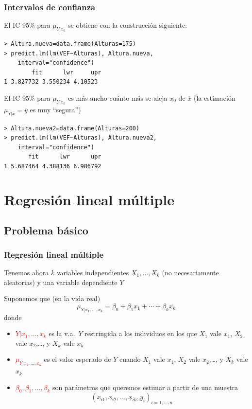 \documentclass[12pt,t]{beamer}
\newcommand{\red}[1]{\textcolor{red}{#1}}
\theoremstyle{plain}
\theoremstyle{definition}
\begin{document}
\begin{frame}[fragile]
\frametitle{Intervalos de confianza}
El IC 95\% para $\mu_{Y|x_0}$ se obtiene con la construcción siguiente:\medskip

\begin{lstlisting}
> Altura.nueva=data.frame(Alturas=175)
> predict.lm(lm(VEF~Alturas), Altura.nueva,
    interval="confidence")
        fit      lwr     upr
1 3.827732 3.550234 4.10523
\end{lstlisting}\medskip

El IC 95\% para $\mu_{Y|x_0}$ es más ancho cuánto más se aleja $x_0$ de $\overline{x}$ (la estimación $\mu_{Y|\overline{x}}=\overline{y}$ es muy ``segura'')\medskip

\begin{lstlisting}
> Altura.nueva2=data.frame(Alturas=200)
> predict.lm(lm(VEF~Alturas), Altura.nueva2,  
    interval="confidence")
       fit      lwr      upr
1 5.687464 4.388136 6.986792
\end{lstlisting}


\end{frame}

\section{Regresión lineal múltiple}
\subsection{Problema básico}
\begin{frame}
\frametitle{Regresión lineal múltiple}

Tenemos ahora $k$ variables independientes $X_1,\ldots, X_k$ (no necesariamente aleatorias) y una
variable dependiente $Y$
\medskip

Suponemos que (en la vida real)
$$
\mu_{Y|x_1,\ldots,x_k}= \beta_0+\beta_1 x_1+\cdots+\beta_k x_k
$$
donde
\begin{itemize}
\item \red{$Y|x_1,\ldots,x_k$} es la v.a.\ $Y$ restringida a los individuos en los que $X_1$ vale $x_1$, $X_2$ vale $x_2$,\ldots, y $X_k$ vale $x_k$\medskip

\item \red{$\mu_{Y|x_1,\ldots,x_k}$} es el valor esperado de $Y$ cuando $X_1$ vale $x_1$, $X_2$ vale $x_2$,\ldots, y $X_k$ vale $x_k$\medskip

\item \red{$\beta_0,\beta_1,\ldots,\beta_k$} son 
parámetros que queremos estimar a partir de una muestra
$$
(x_{i1},x_{i2},\ldots,x_{ik},y_i)_{i=1,\ldots,n}
$$
\end{itemize}
\end{frame}
\end{document}
